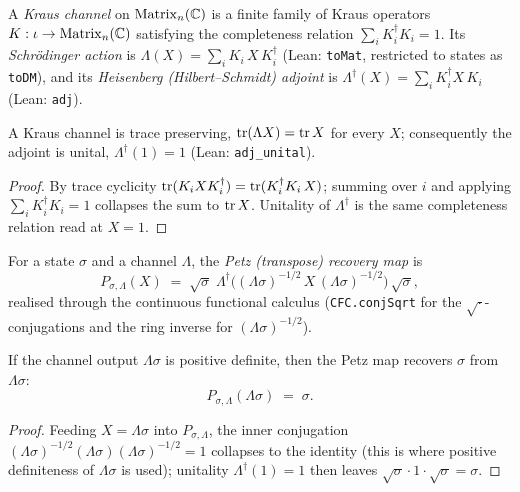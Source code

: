\begin{definition}\label{KrausChannel}
  \leanok
  A \emph{Kraus channel} on \(\operatorname{Matrix}_n(\mathbb{C})\) is a finite family of Kraus operators
  \(K : \iota\to\operatorname{Matrix}_n(\mathbb{C})\) satisfying the completeness relation
  \(\sum_i K_i^{\dagger}K_i = 1\). Its \emph{Schr\"odinger action} is
  \(\Lambda(X)=\sum_i K_i\,X\,K_i^{\dagger}\) (Lean: \texttt{toMat}, restricted to states as
  \texttt{toDM}), and its \emph{Heisenberg (Hilbert--Schmidt) adjoint} is
  \(\Lambda^{\dagger}(X)=\sum_i K_i^{\dagger}X\,K_i\) (Lean: \texttt{adj}).
\end{definition}

\begin{lemma}\label{KrausChannel.toMat_trace}
  \leanok
  A Kraus channel is trace preserving, \(\operatorname{tr}(\Lambda X)=\operatorname{tr} X\) for every \(X\); consequently the
  adjoint is unital, \(\Lambda^{\dagger}(1)=1\) (Lean: \texttt{adj\_unital}).
\end{lemma}
\begin{proof}\leanok
  By trace cyclicity \(\operatorname{tr}(K_i X K_i^{\dagger})=\operatorname{tr}(K_i^{\dagger}K_i\,X)\); summing over \(i\) and
  applying \(\sum_i K_i^{\dagger}K_i=1\) collapses the sum to \(\operatorname{tr} X\). Unitality of
  \(\Lambda^{\dagger}\) is the same completeness relation read at \(X=1\).
\end{proof}

\begin{definition}\label{petz}
  \leanok
  For a state \(\sigma\) and a channel \(\Lambda\), the \emph{Petz (transpose) recovery map} is
  \[
    P_{\sigma,\Lambda}(X) \;=\;
      \sqrt{\sigma}\;\Lambda^{\dagger}\!\bigl((\Lambda\sigma)^{-1/2}\,X\,(\Lambda\sigma)^{-1/2}\bigr)\,
      \sqrt{\sigma},
  \]
  realised through the continuous functional calculus (\texttt{CFC.conjSqrt} for the
  \(\sqrt{\cdot}\)-conjugations and the ring inverse for \((\Lambda\sigma)^{-1/2}\)).
\end{definition}

\begin{theorem}\label{petz_recovery}
  \leanok
  If the channel output \(\Lambda\sigma\) is positive definite, then the Petz map recovers
  \(\sigma\) from \(\Lambda\sigma\):
  \[
    P_{\sigma,\Lambda}(\Lambda\sigma) \;=\; \sigma.
  \]
\end{theorem}
\begin{proof}\leanok
  Feeding \(X=\Lambda\sigma\) into \(P_{\sigma,\Lambda}\), the inner conjugation
  \((\Lambda\sigma)^{-1/2}(\Lambda\sigma)(\Lambda\sigma)^{-1/2}=1\) collapses to the identity (this
  is where positive definiteness of \(\Lambda\sigma\) is used); unitality \(\Lambda^{\dagger}(1)=1\)
  then leaves \(\sqrt{\sigma}\cdot 1\cdot\sqrt{\sigma}=\sigma\).
\end{proof}

